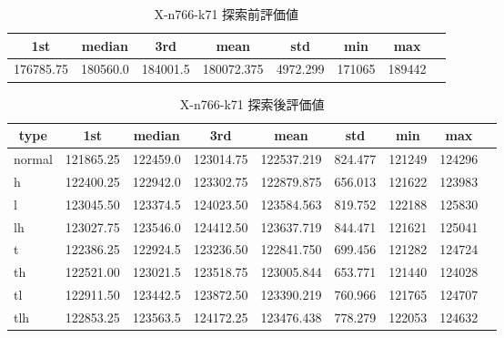 \begin{table}[htbp]
    \caption{X-n766-k71 探索前評価値}
    \begin{tabular}{|l|l|l|l|l|l|l|l|}\hline
    \multicolumn{1}{|c|}{\textbf{1st}}
    &\multicolumn{1}{c|}{\textbf{median}}
    &\multicolumn{1}{c|}{\textbf{3rd}}
    &\multicolumn{1}{c|}{\textbf{mean}}
    &\multicolumn{1}{c|}{\textbf{std}}
    &\multicolumn{1}{c|}{\textbf{min}}
    &\multicolumn{1}{c|}{\textbf{max}}\\\hline
	176785.75 & 180560.0 & 184001.5 & 180072.375 & 4972.299 & 171065 & 189442\\\hline
	\end{tabular}
\end{table}
\begin{table}[htbp]
    \caption{X-n766-k71 探索後評価値}
    \begin{tabular}{|l|l|l|l|l|l|l|l|l|}\hline
    \multicolumn{1}{|c|}{\textbf{type}}
    &\multicolumn{1}{|c|}{\textbf{1st}}
    &\multicolumn{1}{c|}{\textbf{median}}
    &\multicolumn{1}{c|}{\textbf{3rd}}
    &\multicolumn{1}{c|}{\textbf{mean}}
    &\multicolumn{1}{c|}{\textbf{std}}
    &\multicolumn{1}{c|}{\textbf{min}}
    &\multicolumn{1}{c|}{\textbf{max}}\\\hline
	normal & 121865.25 & 122459.0 & 123014.75 & 122537.219 & 824.477 & 121249 & 124296\\\hline
	h & 122400.25 & 122942.0 & 123302.75 & 122879.875 & 656.013 & 121622 & 123983\\\hline
	l & 123045.50 & 123374.5 & 124023.50 & 123584.563 & 819.752 & 122188 & 125830\\\hline
	lh & 123027.75 & 123546.0 & 124412.50 & 123637.719 & 844.471 & 121621 & 125041\\\hline
	t & 122386.25 & 122924.5 & 123236.50 & 122841.750 & 699.456 & 121282 & 124724\\\hline
	th & 122521.00 & 123021.5 & 123518.75 & 123005.844 & 653.771 & 121440 & 124028\\\hline
	tl & 122911.50 & 123442.5 & 123872.50 & 123390.219 & 760.966 & 121765 & 124707\\\hline
	tlh & 122853.25 & 123563.5 & 124172.25 & 123476.438 & 778.279 & 122053 & 124632\\\hline
	\end{tabular}
\end{table}
